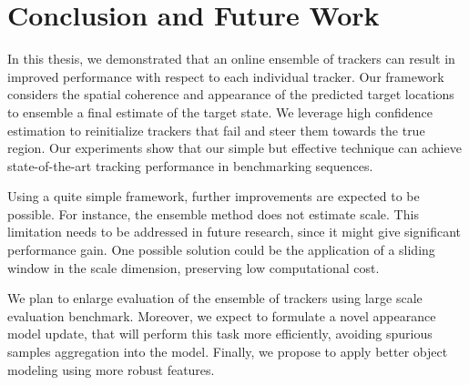 \chapter{Conclusion and Future Work}
\label{chapter::conclusions}

In this thesis, we demonstrated that an online ensemble of trackers can result
in improved performance with respect to each individual tracker. Our framework
considers the spatial coherence and appearance of the predicted target locations
to ensemble a final estimate of the target state. We leverage high confidence
estimation to reinitialize trackers that fail and steer them towards the true
region. Our experiments show that our simple but effective technique can achieve
state-of-the-art tracking performance in benchmarking sequences. 

Using a quite simple framework, further improvements are expected to be
possible. For instance, the ensemble method does not estimate scale. This
limitation needs to be addressed in future research, since it might give
significant performance gain. One possible solution could be the application of
a sliding window in the scale dimension, preserving low computational cost.

We plan to enlarge evaluation of
the ensemble of trackers using large scale evaluation benchmark. Moreover, we
expect to formulate a novel appearance model update, that will perform this task more efficiently, avoiding spurious samples aggregation into the model. Finally,
we propose to apply better object modeling using more robust features.